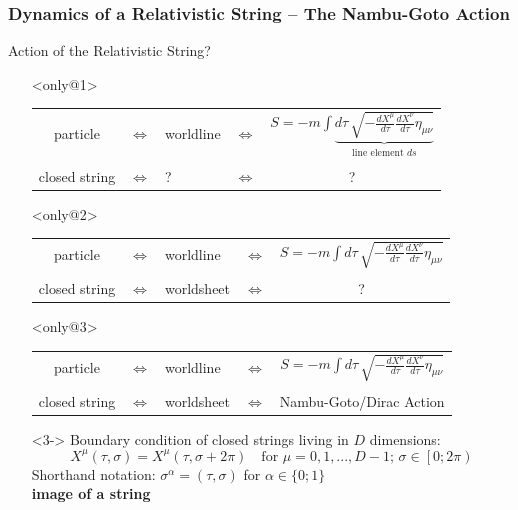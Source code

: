 \documentclass[aspectratio=169]{beamer}
\begin{document}
	\begin{frame}[t]
		\frametitle{Dynamics of a Relativistic String -- The Nambu-Goto Action}
		Action of the Relativistic String?
		\begin{itemize}
			\item[]<only@1>
			\begin{center}
				\begin{tabular}{ccp{1.8cm}cc}
					particle & $\Leftrightarrow$ & worldline & $\Leftrightarrow$ & ${\displaystyle S = -m \int } \underbrace{d\tau \,\sqrt{-\frac{dX^\mu}{d\tau} \frac{dX^\nu}{d\tau}\eta_{\mu\nu}} }_{\text{line element }ds} $ \\[0.7cm]
					&&&&\\
					closed string & $\Leftrightarrow$ &\hphantom{worl} ? \hphantom{heet}& $\Leftrightarrow$ & ? \\
				\end{tabular}
			\end{center}
			\item[]<only@2>
			\begin{center}
				\begin{tabular}{ccp{1.8cm}cc}
					particle & $\Leftrightarrow$ & worldline & $\Leftrightarrow$ & ${\displaystyle S = -m \int d\tau \,\sqrt{-\frac{dX^\mu}{d\tau} \frac{dX^\nu}{d\tau}\eta_{\mu\nu}} }$ \\[0.7cm]
					&&&&\\
					closed string & $\Leftrightarrow$ & worldsheet & $\Leftrightarrow$ & ? \\
				\end{tabular}
			\end{center}
			\item[]<only@3>
			\begin{center}
				\begin{tabular}{ccp{1.8cm}cc}
					particle & $\Leftrightarrow$ & worldline & $\Leftrightarrow$ & ${\displaystyle S = -m \int d\tau \,\sqrt{-\frac{dX^\mu}{d\tau} \frac{dX^\nu}{d\tau}\eta_{\mu\nu}} }$ \\[0.7cm]
					&&&&\\
					closed string & $\Leftrightarrow$ & worldsheet & $\Leftrightarrow$ & Nambu-Goto/Dirac Action \\
				\end{tabular}
			\end{center}
			\item[]<3->
			Boundary condition of closed strings living in $D$ dimensions:
			\begin{equation*}
				X^\mu(\tau,\sigma) = X^\mu(\tau,\sigma+2\pi) \quad  \text{for $\mu$} = 0,1,...,D-1; \, \sigma \in \left[0;2\pi\right)
			\end{equation*}
			Shorthand notation: $\sigma^\alpha = (\tau,\sigma)$ for $\alpha \in \{0;1\}$\\
			\color{red} \textbf{image of a string}
		\end{itemize}
	\end{frame}
	
\end{document}
